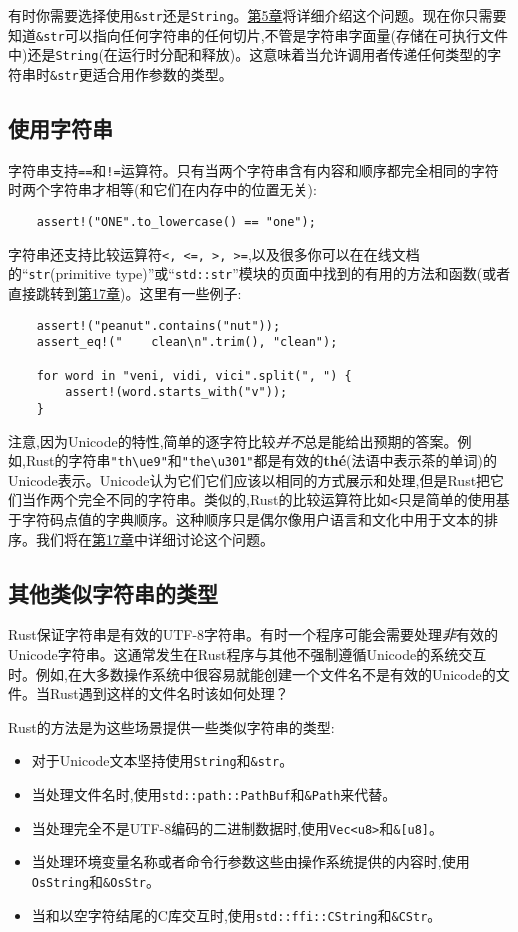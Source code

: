 有时你需要选择使用\texttt{\&str}还是\texttt{String}。\hyperref[ch05]{第5章}将详细介绍这个问题。现在你只需要知道\texttt{\&str}可以指向任何字符串的任何切片,不管是字符串字面量(存储在可执行文件中)还是\texttt{String}(在运行时分配和释放)。这意味着当允许调用者传递任何类型的字符串时\texttt{\&str}更适合用作参数的类型。

\subsection{使用字符串}

字符串支持\texttt{==}和\texttt{!=}运算符。只有当两个字符串含有内容和顺序都完全相同的字符时两个字符串才相等(和它们在内存中的位置无关):
\begin{verbatim}
    assert!("ONE".to_lowercase() == "one");
\end{verbatim}

字符串还支持比较运算符\texttt{<, <=, >, >=},以及很多你可以在在线文档的“\texttt{str}(primitive type)”或“\texttt{std::str}”模块的页面中找到的有用的方法和函数(或者直接跳转到\hyperref[ch17]{第17章})。这里有一些例子:
\begin{verbatim}
    assert!("peanut".contains("nut"));
    assert_eq!("    clean\n".trim(), "clean");

    for word in "veni, vidi, vici".split(", ") {
        assert!(word.starts_with("v"));
    }
\end{verbatim}

注意,因为Unicode的特性,简单的逐字符比较\emph{并不}总是能给出预期的答案。例如,Rust的字符串\texttt{"th\textbackslash u{e9}"}和\texttt{"the\textbackslash u{301}"}都是有效的\textbf{thé}(法语中表示茶的单词)的Unicode表示。Unicode认为它们它们应该以相同的方式展示和处理,但是Rust把它们当作两个完全不同的字符串。类似的,Rust的比较运算符比如\texttt{<}只是简单的使用基于字符码点值的字典顺序。这种顺序只是偶尔像用户语言和文化中用于文本的排序。我们将在\hyperref[ch17]{第17章}中详细讨论这个问题。

\subsection{其他类似字符串的类型}

Rust保证字符串是有效的UTF-8字符串。有时一个程序可能会需要处理\emph{非}有效的Unicode字符串。这通常发生在Rust程序与其他不强制遵循Unicode的系统交互时。例如,在大多数操作系统中很容易就能创建一个文件名不是有效的Unicode的文件。当Rust遇到这样的文件名时该如何处理？

Rust的方法是为这些场景提供一些类似字符串的类型:
\begin{itemize}
    \item 对于Unicode文本坚持使用\texttt{String}和\texttt{\&str}。
    \item 当处理文件名时,使用\texttt{std::path::PathBuf}和\texttt{\&Path}来代替。
    \item 当处理完全不是UTF-8编码的二进制数据时,使用\texttt{Vec<u8>}和\texttt{\&[u8]}。
    \item 当处理环境变量名称或者命令行参数这些由操作系统提供的内容时,使用\texttt{OsString}和\texttt{\&OsStr}。
    \item 当和以空字符结尾的C库交互时,使用\texttt{std::ffi::CString}和\texttt{\&CStr}。
\end{itemize}


